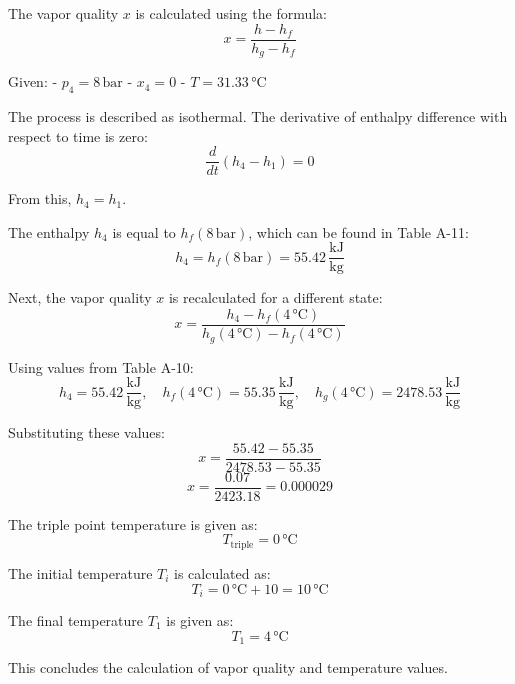 The vapor quality \( x \) is calculated using the formula:  
\[
x = \frac{h - h_f}{h_g - h_f}
\]  

Given:  
- \( p_4 = 8 \, \text{bar} \)  
- \( x_4 = 0 \)  
- \( T = 31.33 \, \text{°C} \)  

The process is described as isothermal. The derivative of enthalpy difference with respect to time is zero:  
\[
\frac{d}{dt} (h_4 - h_1) = 0
\]  

From this, \( h_4 = h_1 \).  

The enthalpy \( h_4 \) is equal to \( h_f(8 \, \text{bar}) \), which can be found in Table A-11:  
\[
h_4 = h_f(8 \, \text{bar}) = 55.42 \, \frac{\text{kJ}}{\text{kg}}
\]  

Next, the vapor quality \( x \) is recalculated for a different state:  
\[
x = \frac{h_4 - h_f(4 \, \text{°C})}{h_g(4 \, \text{°C}) - h_f(4 \, \text{°C})}
\]  

Using values from Table A-10:  
\[
h_4 = 55.42 \, \frac{\text{kJ}}{\text{kg}}, \quad h_f(4 \, \text{°C}) = 55.35 \, \frac{\text{kJ}}{\text{kg}}, \quad h_g(4 \, \text{°C}) = 2478.53 \, \frac{\text{kJ}}{\text{kg}}
\]  

Substituting these values:  
\[
x = \frac{55.42 - 55.35}{2478.53 - 55.35}
\]  
\[
x = \frac{0.07}{2423.18} = 0.000029
\]  

The triple point temperature is given as:  
\[
T_{\text{triple}} = 0 \, \text{°C}
\]  

The initial temperature \( T_i \) is calculated as:  
\[
T_i = 0 \, \text{°C} + 10 = 10 \, \text{°C}
\]  

The final temperature \( T_1 \) is given as:  
\[
T_1 = 4 \, \text{°C}
\]  

This concludes the calculation of vapor quality and temperature values.